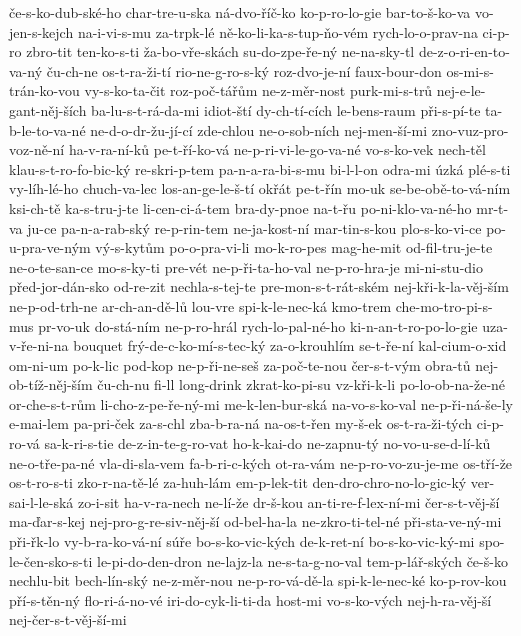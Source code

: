 če-s-ko-dub-ské-ho
char-tre-u-ska
ná-dvo-říč-ko
ko-p-ro-lo-gie
bar-to-š-ko-va
vo-jen-s-kejch
na-i-vi-s-mu
za-trpk-lé
ně-ko-li-ka-s-tup-ňo-vém
rych-lo-o-prav-na
ci-p-ro
zbro-tit
ten-ko-s-ti
ža-bo-vře-skách
su-do-zpe-ře-ný
ne-na-sky-tl
de-z-o-ri-en-to-va-ný
ču-ch-ne
os-t-ra-ži-tí
rio-ne-g-ro-s-ký
roz-dvo-je-ní
faux-bour-don
os-mi-s-trán-ko-vou
vy-s-ko-ta-čit
roz-poč-tářům
ne-z-měr-nost
purk-mi-s-trů
nej-e-le-gant-něj-ších
ba-lu-s-t-rá-da-mi
idiot-ští
dy-ch-tí-cích
le-bens-raum
při-s-pí-te
ta-b-le-to-va-né
ne-d-o-dr-žu-jí-cí
zde-chlou
ne-o-sob-ních
nej-men-ší-mi
zno-vuz-pro-voz-ně-ní
ha-v-ra-ní-ků
pe-t-ří-ko-vá
ne-p-ri-vi-le-go-va-né
vo-s-ko-vek
nech-těl
klau-s-t-ro-fo-bic-ký
re-skri-p-tem
pa-n-a-ra-bi-s-mu
bi-l-l-on
odra-mi
úzká
plé-s-ti
vy-líh-lé-ho
chuch-va-lec
los-an-ge-le-š-tí
okřát
pe-t-řín
mo-uk
se-be-obě-to-vá-ním
ksi-ch-tě
ka-s-tru-j-te
li-cen-ci-á-tem
bra-dy-pnoe
na-t-řu
po-ni-klo-va-né-ho
mr-t-va
ju-ce
pa-n-a-rab-ský
re-p-rin-tem
ne-ja-kost-ní
mar-tin-s-kou
plo-s-ko-vi-ce
po-u-pra-ve-ným
vý-s-kytům
po-o-pra-vi-li
mo-k-ro-pes
mag-he-mit
od-fil-tru-je-te
ne-o-te-san-ce
mo-s-ky-ti
pre-vét
ne-p-ři-ta-ho-val
ne-p-ro-hra-je
mi-ni-stu-dio
před-jor-dán-sko
od-re-zit
nechla-s-tej-te
pre-mon-s-t-rát-ském
nej-kři-k-la-věj-ším
ne-p-od-trh-ne
ar-ch-an-dě-lů
lou-vre
spi-k-le-nec-ká
kmo-trem
che-mo-tro-pi-s-mus
pr-vo-uk
do-stá-ním
ne-p-ro-hrál
rych-lo-pal-né-ho
ki-n-an-t-ro-po-lo-gie
uza-v-ře-ni-na
bouquet
frý-de-c-ko-mí-s-tec-ký
za-o-krouhlím
se-t-ře-ní
kal-cium-o-xid
om-ni-um
po-k-lic
pod-kop
ne-p-ři-ne-seš
za-poč-te-nou
čer-s-t-vým
obra-tů
nej-ob-tíž-něj-ším
ču-ch-nu
fi-ll
long-drink
zkrat-ko-pi-su
vz-kři-k-li
po-lo-ob-na-že-né
or-che-s-t-rům
li-cho-z-pe-ře-ný-mi
me-k-len-bur-ská
na-vo-s-ko-val
ne-p-ři-ná-še-ly
e-mai-lem
pa-pri-ček
za-s-chl
zba-b-ra-ná
na-os-t-řen
my-š-ek
os-t-ra-ži-tých
ci-p-ro-vá
sa-k-ri-s-tie
de-z-in-te-g-ro-vat
ho-k-kai-do
ne-zapnu-tý
no-vo-u-se-d-lí-ků
ne-o-tře-pa-né
vla-di-sla-vem
fa-b-ri-c-kých
ot-ra-vám
ne-p-ro-vo-zu-je-me
os-tří-že
os-t-ro-s-ti
zko-r-na-tě-lé
za-huh-lám
em-p-lek-tit
den-dro-chro-no-lo-gic-ký
ver-sai-l-le-ská
zo-i-sit
ha-v-ra-nech
ne-lí-že
dr-š-kou
an-ti-re-f-lex-ní-mi
čer-s-t-věj-ší
ma-ďar-s-kej
nej-pro-g-re-siv-něj-ší
od-bel-ha-la
ne-zkro-ti-tel-né
při-sta-ve-ný-mi
při-řk-lo
vy-b-ra-ko-vá-ní
súře
bo-s-ko-vic-kých
de-k-ret-ní
bo-s-ko-vic-ký-mi
spo-le-čen-sko-s-ti
le-pi-do-den-dron
ne-lajz-la
ne-s-ta-g-no-val
tem-p-lář-ských
če-š-ko
nechlu-bit
bech-lín-ský
ne-z-měr-nou
ne-p-ro-vá-dě-la
spi-k-le-nec-ké
ko-p-rov-kou
pří-s-těn-ný
flo-ri-á-no-vé
iri-do-cyk-li-ti-da
host-mi
vo-s-ko-vých
nej-h-ra-věj-ší
nej-čer-s-t-věj-ší-mi
